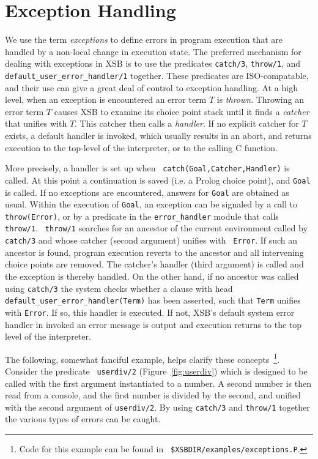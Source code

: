 \chapter{Exception Handling}\label{chap:exception}

We use the term {\em exceptions} to define errors in program execution
that are handled by a non-local change in execution state.  The
preferred mechanism for dealing with exceptions in XSB is to use the
predicates {\tt catch/3}, {\tt throw/1}, and {\tt
default\_user\_error\_handler/1} together.  These predicates are
ISO-compatable, and their use can give a great deal of control to
exception handling.  At a high level, when an exception is encountered
an error term $T$ is {\em thrown}.  Throwing an error term $T$ causes
XSB to examine its choice point stack until it finds a {\em catcher}
that unifies with $T$.  This catcher then calls a {\em handler}.  If
no explicit catcher for $T$ exists, a default handler is invoked,
which usually results in an abort, and returns execution to the
top-level of the interpreter, or to the calling C function.

More precisely, a handler is set up when {\tt
  catch(Goal,Catcher,Handler)} is called.  At this point a
continuation is saved (i.e. a Prolog choice point), and {\tt Goal} is
called.  If no exceptions are encountered, answers for {\tt Goal} are
obtained as usual.  Within the execution of {\tt Goal}, an exception
can be signaled by a call to {\tt throw(Error)}, or by a predicate in
the {\tt error\_handler} module that calls {\tt throw/1}.  {\tt
  throw/1} searches for an ancestor of the current environment called
by {\tt catch/3} and whose catcher (second argument) unifies with {\tt
  Error}.  If such an ancestor is found, program execution reverts to
the ancestor and all intervening choice points are removed.  The
catcher's handler (third argument) is called and the exception is
thereby handled.  On the other hand, if no ancestor was called using
{\tt catch/3} the system checks whether a clause with head {\tt
  default\_user\_error\_handler(Term)} has been asserted, such that
{\tt Term} unifies with {\tt Error}.  If so, this handler is executed.
If not, XSB's default system error handler in invoked an error message
is output and execution returns to the top level of the interpreter.

The following, somewhat fanciful example, helps clarify these
concepts~\footnote{Code for this example can be found in {\tt
\$XSBDIR/examples/exceptions.P}.}.  Consider the predicate {\tt
userdiv/2} (Figure~\ref{fig:userdiv}) which is designed to be called
with the first argument instantiated to a number.  A second number is
then read from a console, and the first number is divided by the
second, and unified with the second argument of {\tt userdiv/2}.  By
using {\tt catch/3} and {\tt throw/1} together the various types of
errors can be caught.

